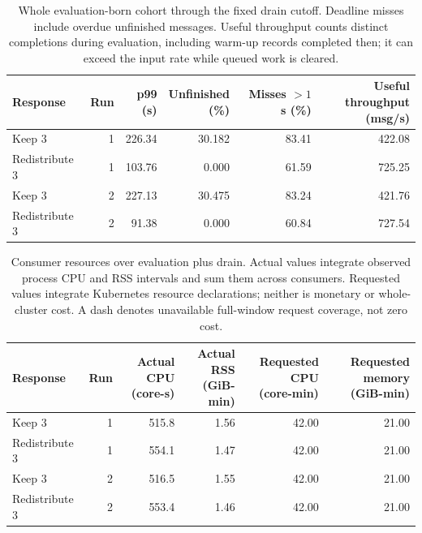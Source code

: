 \begin{table}[!htbp]
\centering\small
\setlength{\tabcolsep}{3pt}
\renewcommand{\arraystretch}{1.12}
\begin{tabular}{@{}lrrrrr@{}}
\toprule
Response & Run & \shortstack{p99\\(s)} & \shortstack{Unfinished\\(\%)} & \shortstack{Misses $>1$ s\\(\%)} & \shortstack{Useful throughput\\(msg/s)}\\
\midrule
Keep 3 & 1 & 226.34 & 30.182 & 83.41 & 422.08\\
Redistribute 3 & 1 & 103.76 & 0.000 & 61.59 & 725.25\\
Keep 3 & 2 & 227.13 & 30.475 & 83.24 & 421.76\\
Redistribute 3 & 2 & 91.38 & 0.000 & 60.84 & 727.54\\
\bottomrule
\end{tabular}
\caption{Whole evaluation-born cohort through the fixed drain cutoff. Deadline misses include overdue unfinished messages. Useful throughput counts distinct completions during evaluation, including warm-up records completed then; it can exceed the input rate while queued work is cleared.}
\label{tab:short-redistribution-outcomes}
\end{table}
\begin{table}[!htbp]
\centering\small
\setlength{\tabcolsep}{3pt}
\renewcommand{\arraystretch}{1.12}
\begin{tabular}{@{}lrrrrr@{}}
\toprule
Response & Run & \shortstack{Actual CPU\\(core-s)} & \shortstack{Actual RSS\\(GiB-min)} & \shortstack{Requested CPU\\(core-min)} & \shortstack{Requested memory\\(GiB-min)}\\
\midrule
Keep 3 & 1 & 515.8 & 1.56 & 42.00 & 21.00\\
Redistribute 3 & 1 & 554.1 & 1.47 & 42.00 & 21.00\\
Keep 3 & 2 & 516.5 & 1.55 & 42.00 & 21.00\\
Redistribute 3 & 2 & 553.4 & 1.46 & 42.00 & 21.00\\
\bottomrule
\end{tabular}
\caption{Consumer resources over evaluation plus drain. Actual values integrate observed process CPU and RSS intervals and sum them across consumers. Requested values integrate Kubernetes resource declarations; neither is monetary or whole-cluster cost. A dash denotes unavailable full-window request coverage, not zero cost.}
\label{tab:short-redistribution-resources}
\end{table}
